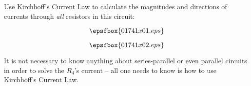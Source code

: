 

Use Kirchhoff's Current Law to calculate the magnitudes and directions of currents through {\it all} resistors in this circuit:

$$\epsfbox{01741x01.eps}$$







$$\epsfbox{01741x02.eps}$$







It is not necessary to know anything about series-parallel or even parallel circuits in order to solve the $R_4$'s current -- all one needs to know is how to use Kirchhoff's Current Law.




